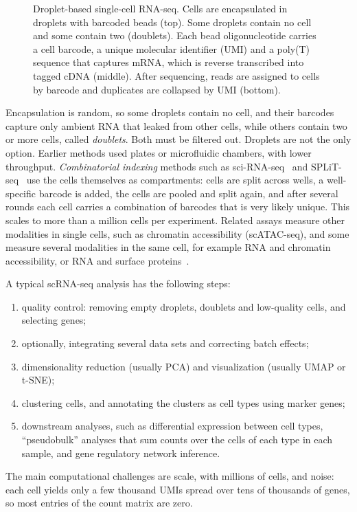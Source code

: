 \begin{figure}[!htbp]
  \caption{Droplet-based single-cell RNA-seq. Cells are encapsulated in droplets with barcoded beads (top). Some droplets contain no cell and some contain two (doublets). Each bead oligonucleotide carries a cell barcode, a unique molecular identifier (UMI) and a poly(T) sequence that captures mRNA, which is reverse transcribed into tagged cDNA (middle). After sequencing, reads are assigned to cells by barcode and duplicates are collapsed by UMI (bottom).}
  \label{fig:scrnaseq}
\end{figure}

Encapsulation is random, so some droplets contain no cell, and their barcodes capture only ambient RNA that leaked from other cells, while others contain two or more cells, called \emph{doublets}. Both must be filtered out. Droplets are not the only option. Earlier methods used plates or microfluidic chambers, with lower throughput. \emph{Combinatorial indexing} methods such as sci-RNA-seq~\citep{cao2017} and SPLiT-seq~\citep{rosenberg2018} use the cells themselves as compartments: cells are split across wells, a well-specific barcode is added, the cells are pooled and split again, and after several rounds each cell carries a combination of barcodes that is very likely unique. This scales to more than a million cells per experiment. Related assays measure other modalities in single cells, such as chromatin accessibility (scATAC-seq), and some measure several modalities in the same cell, for example RNA and chromatin accessibility, or RNA and surface proteins~\citep{stoeckius2017}.

A typical scRNA-seq analysis has the following steps:
\begin{enumerate}
  \item quality control: removing empty droplets, doublets and low-quality cells, and selecting genes;
  \item optionally, integrating several data sets and correcting batch effects;
  \item dimensionality reduction (usually PCA) and visualization (usually UMAP or t-SNE);
  \item clustering cells, and annotating the clusters as cell types using marker genes;
  \item downstream analyses, such as differential expression between cell types, ``pseudobulk'' analyses that sum counts over the cells of each type in each sample, and gene regulatory network inference.
\end{enumerate}
The main computational challenges are scale, with millions of cells, and noise: each cell yields only a few thousand UMIs spread over tens of thousands of genes, so most entries of the count matrix are zero.

